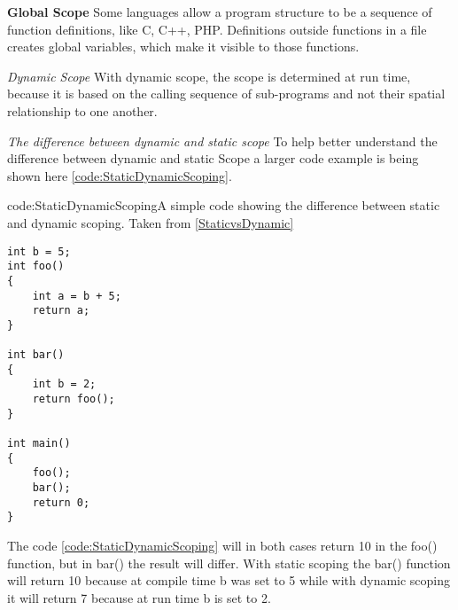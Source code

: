 \textbf{Global Scope}
Some languages allow a program structure to be a sequence of function definitions, like C, C++, PHP. Definitions outside functions in a file creates global variables, which make it visible to those functions.

\textit{Dynamic Scope}
With dynamic scope, the scope is determined at run time, because it is based on the calling sequence of sub-programs and not their spatial relationship to one another.

\textit{The difference between dynamic and static scope}
To help better understand the difference between dynamic and static Scope a larger code example is being shown here \ref{code:StaticDynamicScoping}.
\begin{code}{code:StaticDynamicScoping}{A simple code showing the difference between static and dynamic scoping. Taken from \ref{StaticvsDynamic}}
\begin{lstlisting}
int b = 5;
int foo()
{
	int a = b + 5;
	return a;
}

int bar()
{
	int b = 2;
	return foo();
}

int main()
{
	foo();
	bar();
	return 0;
}
\end{lstlisting}
\end{code}
The code \ref{code:StaticDynamicScoping} will in both cases return 10 in the foo() function, but in bar() the result will differ. With static scoping the bar() function will return 10 because at compile time b was set to 5 while with dynamic scoping it will return 7 because at run time b is set to 2.